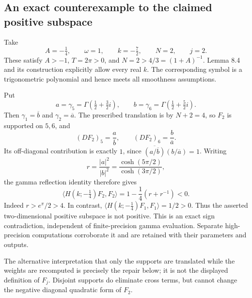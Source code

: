 \documentclass[10pt]{article}
\begin{document}
\subsection*{An exact counterexample to the claimed positive subspace}
Take \[A=-\tfrac14,\qquad \omega=1,\qquad k=-\tfrac72,\qquad
 N=2,\qquad j=2.\] These satisfy \(A>-1\), \(T=2\pi>0\), and \(N=2>4/3=(1+A)^{-1}\). Lemma 8.4 and its construction explicitly allow every real \(k\). The corresponding symbol is a trigonometric polynomial and hence meets all smoothness assumptions.\par
Put \[a=\gamma_5=\Gamma(\tfrac12+\tfrac32i),\qquad
 b=\gamma_6=\Gamma(\tfrac12+\tfrac52i).\] Then \(\gamma_1=\overline b\) and \(\gamma_2=\overline a\). The prescribed translation is by \(N+2=4\), so \(F_2\) is supported on \(5,6\), and \[(DF_2)_5=\frac a{\overline b},\qquad
 (DF_2)_6=\frac b{\overline a}.\] Its off-diagonal contribution is exactly \(1\), since \(\overline{(a/\overline b)}(b/\overline a)=1\). Writing \[r=\frac{|a|^2}{|b|^2}
   =\frac{\cosh(5\pi/2)}{\cosh(3\pi/2)},\] the gamma reflection identity therefore gives \[\langle H(k;-\tfrac14)F_2,F_2\rangle
    =1-\frac14(r+r^{-1})<0.\] Indeed \(r>e^\pi/2>4\). In contrast, \(\langle H(k;-\tfrac14)F_1,F_1\rangle=1/2>0\). Thus the asserted two-dimensional positive subspace is not positive. This is an exact sign contradiction, independent of finite-precision gamma evaluation. Separate high-precision computations corroborate it and are retained with their parameters and outputs.\par
The alternative interpretation that only the supports are translated while the weights are recomputed is precisely the repair below; it is not the displayed definition of \(F_j\). Disjoint supports do eliminate cross terms, but cannot change the negative diagonal quadratic form of \(F_2\).\par
\end{document}
